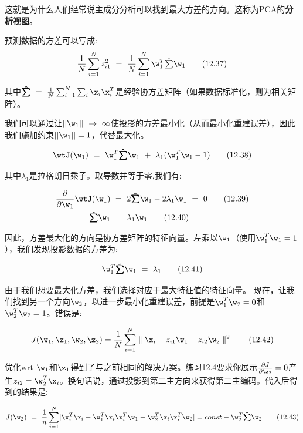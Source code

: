 \documentclass[a4paper]{article}
\begin{document}
这就是为什么人们经常说主成分分析可以找到最大方差的方向。这称为PCA的\textbf{分析视图}。

预测数据的方差可以写成:
\begin{equation}
	\frac{1}{N}\sum_{i=1}^{N}z_{i1}^2\ =\ \frac{1}{N}\sum_{i=1}^{N}\w_1^T\textstyle{\hat\sum}\w_1\tag{12.37}
\end{equation}

其中$\textstyle\boldsymbol{\hat{\sum}}\ =\ \frac{1}{N}\sum_{i=1}^{N}\sum\nolimits_{i}\x_i\x_i^T$是经验协方差矩阵（如果数据标准化，则为相关矩阵）。 


我们可以通过让$||\w_1||\ \rightarrow\ \infty$使投影的方差最小化（从而最小化重建误差），因此我们施加约束$||\w_1|| =1$，代替最大化。

\begin{equation}
	\wtJ(\w_1)\ =\ \w_1^T\textstyle\boldsymbol{\hat{\sum}}\w_1\ +\ \lambda_1(\w_1^T\w_1-1)\tag{12.38}
\end{equation}


其中$\lambda_1$是拉格朗日乘子。取导数并等于零,我们有:

\begin{align}
	\dfrac{\partial}{\partial \w_1}\wtJ(\w_1)\ &=\ 2\textstyle\boldsymbol{\hat{\sum}}\w_1-2\lambda_1\w_1\ =\ 0\tag{12.39}\\
	\textstyle\boldsymbol{\hat{\sum}}\w_1\ &=\ \lambda_1\w_1\tag{12.40}
\end{align}

因此，方差最大化的方向是协方差矩阵的特征向量。左乘以$\w_1$（使用$\w_1^T\w_1=1$），我们发现投影数据的方差为:
 
\begin{equation}
	\w_1^T\textstyle\boldsymbol{\hat{\sum}}\w_1\ =\ \lambda_1\tag{12.41}
\end{equation}

由于我们想要最大化方差，我们选择对应于最大特征值的特征向量。
现在，让我们找到另一个方向$\w_2$，以进一步最小化重建误差，前提是$\w_1^T\w_2=0$和$\w_2^T\w_2=1$。错误是:

\begin{equation}
	J(\w_1,\z_1,\w_2,\z_2)=\frac{1}{N}\sum_{i=1}^{N}\parallel\x_i-z_{i1}\w_1-z_{i2}\w_2\parallel^2\tag{12.42}
\end{equation}

优化wrt $\w_1$和$\z_1$得到了与之前相同的解决方案。练习12.4要求你展示$\frac{\partial J}{\partial \z_2}=0$产生$z_{i2}=\w_2^T\x_i$。换句话说，通过投影到第二主方向来获得第二主编码。代入后得到的结果是:

\begin{equation}
	J(\w_2)\ =\ \frac{1}{n}\sum_{i=1}^{N}[\x_i^T\x_i-\w_1^T\x_i\x_i^T\w_1-\w_2^T\x_i\x_i^T\w_2]=const-\w_2^T\textstyle\boldsymbol{\hat{\sum}}\w_2\tag{12.43}
\end{equation}
\end{document}
